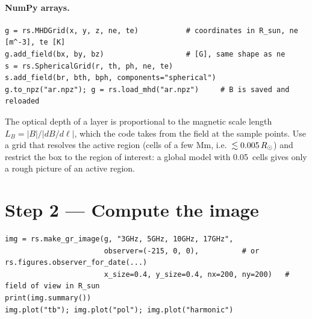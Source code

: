 \paragraph{NumPy arrays.}
\begin{lstlisting}[style=pyex]
g = rs.MHDGrid(x, y, z, ne, te)           # coordinates in R_sun, ne [m^-3], te [K]
g.add_field(bx, by, bz)                   # [G], same shape as ne
s = rs.SphericalGrid(r, th, ph, ne, te)
s.add_field(br, bth, bph, components="spherical")
g.to_npz("ar.npz"); g = rs.load_mhd("ar.npz")     # B is saved and reloaded
\end{lstlisting}

\begin{warn}[Resolution]
The optical depth of a layer is proportional to the magnetic scale length
$L_B=|B|/|dB/d\ell|$, which the code takes from the field at the sample points. Use a grid
that resolves the active region (cells of a few Mm, i.e.\ $\lesssim0.005\,R_\odot$) and
restrict the box to the region of interest: a global model with 0.05\,\rsun{} cells gives
only a rough picture of an active region.
\end{warn}

\section{Step 2 --- Compute the image}

\begin{lstlisting}[style=pyex]
img = rs.make_gr_image(g, "3GHz, 5GHz, 10GHz, 17GHz",
                       observer=(-215, 0, 0),          # or rs.figures.observer_for_date(...)
                       x_size=0.4, y_size=0.4, nx=200, ny=200)   # field of view in R_sun
print(img.summary())
img.plot("tb"); img.plot("pol"); img.plot("harmonic")
\end{lstlisting}


